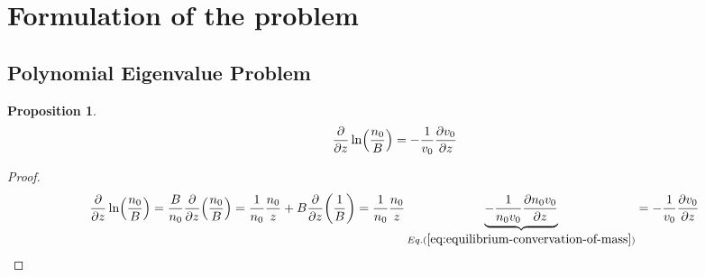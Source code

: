 \documentclass{article}
\theoremstyle{plain}
\newtheorem{proposition}{Proposition}
\theoremstyle{definition}
\theoremstyle{remark}
\theoremstyle{remark}
\begin{document}
\section{Formulation of the problem}
\subsection{Polynomial Eigenvalue Problem}
\begin{proposition}
    \begin{equation}
        \pdv{z}\ln(\frac{n_0}{B}) = -\frac{1}{v_0}\pdv{v_0}{z}
        \label{eq:dv-ln}
    \end{equation}
\end{proposition}
\begin{proof}
    \[ \pdv{z}\ln(\frac{n_0}{B}) 
    = \frac{B}{n_0}\pdv{z}(\frac{n_0}{B})
    = \frac{1}{n_0}\frac{n_0}{z} + B\pdv{z}(\frac{1}{B})
    =
    \frac{1}{n_0}\frac{n_0}{z} \underbrace{- \frac{1}{n_0v_0}\pdv{n_0v_0}{z}}_{Eq.(\ref{eq:equilibrium-convervation-of-mass})}
    = -\frac{1}{v_0}\pdv{v_0}{z} \]
\end{proof}
\end{document}
